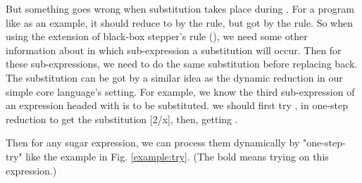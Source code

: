 But something goes wrong when substitution takes place during . For a program like  as an example, it should reduce to  by the  rule, but got  by the  rule. So when using the extension of black-box stepper's rule (), we need some other information about in which sub-expression a substitution will occur. Then for these sub-expressions, we need to do the same substitution before replacing back. The substitution can be got by a similar idea as the dynamic reduction in our simple core language's setting. For example, we know the third sub-expression of an expression headed with  is to be substituted. we should first try ,  in one-step reduction to get the substitution [2/x], then, getting .

Then for any sugar expression, we can process them dynamically by "one-step-try" like the example in Fig.  \ref{example:try}. (The bold  means trying on this expression.)

